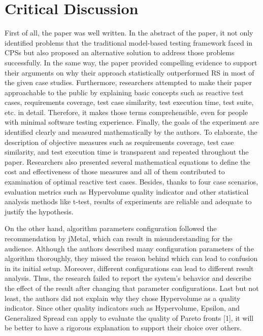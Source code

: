\documentclass[10pt,a4paper]{report}
\begin{document}
\section{Critical Discussion}

First of all, the paper was well written. In the abstract of the paper, it not only identiﬁed problems that the traditional model-based testing framework faced in CPSs but also proposed an alternative solution to address those problems successfully. In the same way, the paper provided compelling evidence to support their arguments on why their approach statistically outperformed RS in most of the given case studies. Furthermore, researchers attempted to make their paper approachable to the public by explaining basic concepts such as reactive test cases, requirements coverage, test case similarity, test execution time, test suite, etc. in detail. Therefore, it makes those terms comprehensible, even for people with minimal software testing experience. Finally, the goals of the experiment are identiﬁed clearly and measured mathematically by the authors. To elaborate, the description of objective measures such as requirements coverage, test case similarity, and test execution time is transparent and repeated throughout the paper. Researchers also presented several mathematical equations to deﬁne the cost and eﬀectiveness of those measures and all of them contributed to examination of optimal reactive test cases. Besides, thanks to four case scenarios, evaluation metrics such as Hypervolume quality indicator and other statistical analysis methods like t-test, results of experiments are reliable and adequate to justify the hypothesis.

On the other hand, algorithm parameters conﬁguration followed the recommendation by jMetal, which can result in misunderstanding for the audience. Although the authors described many conﬁguration parameters of the algorithm thoroughly, they missed the reason behind which can lead to confusion in its initial setup. Moreover, diﬀerent configurations can lead to diﬀerent result analysis. Thus, the research failed to report the system’s behavior and describe the eﬀect of the result after changing that parameter conﬁgurations. Last but not least, the authors did not explain why they chose Hypervolume as a quality indicator. Since other quality indicators such as Hypervolume, Epsilon, and Generalized Spread can apply to evaluate the quality of Pareto fronts [1], it will be better to have a rigorous explanation to support their choice over others.
\end{document}
